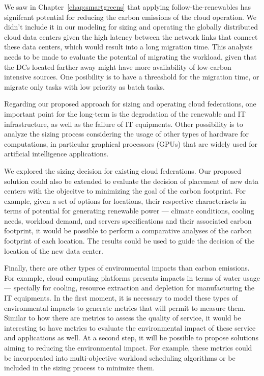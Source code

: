 We saw in Chapter~\ref{chap:smartgreens} that applying follow-the-renewables has signifcant potential for reducing the carbon emissions of the cloud operation. We didn't include it in our modeling for sizing and operating the globally distributed cloud data centers given the high latency between the network links that connect these data centers, which would result into a long migration time. This analysis needs to be made to evaluate the potential of migrating the workload, given that the DCs located farther away might have more availability of low-carbon intensive sources. One posibility is to have a threeshold for the migration time, or migrate only tasks with low priority as batch tasks.

Regarding our proposed approach for sizing and operating cloud federations, one important point for the long-term is the degradation of the renewable and IT infrastructure, as well as the failure of IT equipments. Other possibility is to analyze the sizing process considering the usage of other types of hardware for computations, in particular graphical processors (GPUs) that are widely used for artificial intelligence applications.

We explored the sizing decision for existing cloud federations. Our proposed solution could also be extended to evaluate the decision of placement of new data centers with the objecitve to minimizing the goal of the carbon footprint. For example, given a set of options for locations, their respective characteriscts in terms of potential for generating renewable power --- climate conditions, cooling needs, workload demand, and servers specifications and their associated carbon footprint, it would be possible to perform a comparative analyses of the carbon footprint of each location. The results could be used to guide the decision of the location of the new data center.


Finally, there are other types of environmental impacts than carbon emissions. For example, cloud computing platforms presents impacts in terms of water usage --- specially for cooling, resource extraction and depletion for manufacturing the IT equipments. In the first moment, it is necessary to model these types of environmental impacts to generate metrics that will permit to measure them. Similar to how there are metrics to assess the quality of service, it would be interesting to have metrics to evaluate the environmental impact of these service and applications as well. At a second step, it will be possible to propose solutions aiming to reducing the environmental impact. For example, these metrics could be incorporated into multi-objective workload scheduling algorithms or be included in the sizing process to minimize them.

